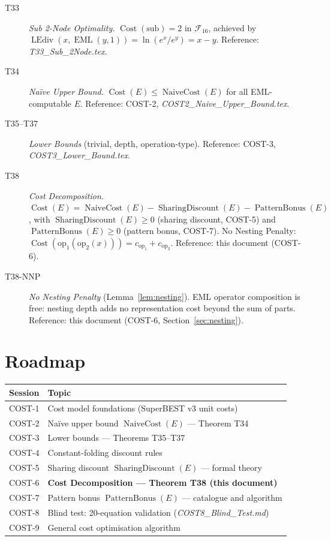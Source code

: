 \documentclass[12pt,a4paper]{article}
\theoremstyle{definition}
\newcommand{\EML}{\operatorname{EML}}
\newcommand{\LEdiv}{\operatorname{LEdiv}}
\newcommand{\Cost}{\operatorname{Cost}}
\newcommand{\NC}{\operatorname{NaiveCost}}
\newcommand{\SD}{\operatorname{SharingDiscount}}
\newcommand{\PB}{\operatorname{PatternBonus}}
\begin{document}
\begin{description}
  \item[T33] \emph{Sub 2-Node Optimality.}
        $\Cost(\mathrm{sub}) = 2$ in $\mathcal{F}_{16}$, achieved by
        $\LEdiv(x, \EML(y,1)) = \ln(e^x/e^y) = x-y$.
        Reference: \textit{T33\_Sub\_2Node.tex}.

  \item[T34] \emph{Na\"{i}ve Upper Bound.}
        $\Cost(E) \leq \NC(E)$ for all EML-computable $E$.
        Reference: COST-2, \textit{COST2\_Naive\_Upper\_Bound.tex}.

  \item[T35--T37] \emph{Lower Bounds} (trivial, depth, operation-type).
        Reference: COST-3, \textit{COST3\_Lower\_Bound.tex}.

  \item[T38] \emph{Cost Decomposition.}
        $\Cost(E) = \NC(E) - \SD(E) - \PB(E)$, with
        $\SD(E) \geq 0$ (sharing discount, COST-5) and
        $\PB(E) \geq 0$ (pattern bonus, COST-7).
        No Nesting Penalty: $\Cost(\mathrm{op}_1(\mathrm{op}_2(x)))
        = c_{\mathrm{op}_1} + c_{\mathrm{op}_2}$.
        Reference: this document (COST-6).

  \item[T38-NNP] \emph{No Nesting Penalty} (Lemma~\ref{lem:nesting}).
        EML operator composition is free: nesting depth adds no
        representation cost beyond the sum of parts.
        Reference: this document (COST-6, Section~\ref{sec:nesting}).
\end{description}

\section{Roadmap}
\label{sec:roadmap}

\begin{center}
\begin{tabular}{@{}ll@{}}
\toprule
\textbf{Session} & \textbf{Topic} \\
\midrule
COST-1 & Cost model foundations (SuperBEST v3 unit costs) \\
COST-2 & Na\"{i}ve upper bound $\NC(E)$ --- Theorem T34 \\
COST-3 & Lower bounds --- Theorems T35--T37 \\
COST-4 & Constant-folding discount rules \\
COST-5 & Sharing discount $\SD(E)$ --- formal theory \\
COST-6 & \textbf{Cost Decomposition --- Theorem T38 (this document)} \\
COST-7 & Pattern bonus $\PB(E)$ --- catalogue and algorithm \\
COST-8 & Blind test: 20-equation validation (\textit{COST8\_Blind\_Test.md}) \\
COST-9 & General cost optimisation algorithm \\
\bottomrule
\end{tabular}
\end{center}
\end{document}
